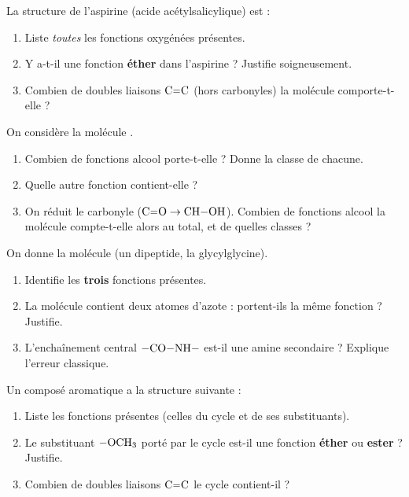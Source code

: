 \documentclass[11pt,a4paper]{article}
\begin{document}
\begin{exo}
La structure de l'aspirine (acide acétylsalicylique) est :
\begin{center}
\end{center}
\begin{enumerate}[label=\alph*)]
  \item Liste \emph{toutes} les fonctions oxygénées présentes.
  \item Y a-t-il une fonction \textbf{éther} dans l'aspirine ? Justifie soigneusement.
  \item Combien de doubles liaisons $\ce{C=C}$ (hors carbonyles) la molécule comporte-t-elle ?
\end{enumerate}
\end{exo}

\begin{exo}
On considère la molécule .
\begin{enumerate}[label=\alph*)]
  \item Combien de fonctions alcool porte-t-elle ? Donne la classe de chacune.
  \item Quelle autre fonction contient-elle ?
  \item On réduit le carbonyle ($\ce{C=O}\rightarrow\ce{CH-OH}$). Combien de fonctions alcool la molécule compte-t-elle alors au total, et de quelles classes ?
\end{enumerate}
\end{exo}

\begin{exo}
On donne la molécule  (un dipeptide, la glycylglycine).
\begin{enumerate}[label=\alph*)]
  \item Identifie les \textbf{trois} fonctions présentes.
  \item La molécule contient deux atomes d'azote : portent-ils la même fonction ? Justifie.
  \item L'enchaînement central $-\ce{CO-NH}-$ est-il une amine secondaire ? Explique l'erreur classique.
\end{enumerate}
\end{exo}

\begin{exo}
Un composé aromatique a la structure suivante :
\begin{center}
\end{center}
\begin{enumerate}[label=\alph*)]
  \item Liste les fonctions présentes (celles du cycle et de ses substituants).
  \item Le substituant $-\ce{OCH3}$ porté par le cycle est-il une fonction \textbf{éther} ou \textbf{ester} ? Justifie.
  \item Combien de doubles liaisons $\ce{C=C}$ le cycle contient-il ?
\end{enumerate}
\end{exo}
\end{document}
